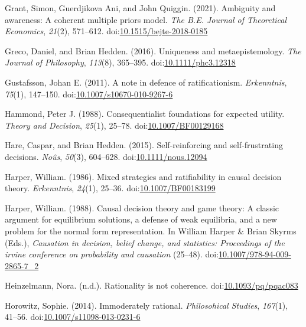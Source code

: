 \documentclass[
  12pt,
  letterpaper,
  DIV=11,
  numbers=noendperiod]{scrreprt}
\newlength{\cslhangindent}
\newenvironment{CSLReferences}[2] %
 {\begin{list}{}{%
  \setlength{\itemindent}{0pt}
  \setlength{\leftmargin}{0pt}
  \setlength{\parsep}{0pt}
  \ifodd #1
   \setlength{\leftmargin}{\cslhangindent}
   \setlength{\itemindent}{-1\cslhangindent}
  \fi
  \setlength{\itemsep}{#2\baselineskip}}}
 {\end{list}}
\begin{document}
\begin{CSLReferences}{1}{0}
Grant, Simon, Guerdjikova Ani, and John Quiggin. (2021). Ambiguity and
awareness: A coherent multiple priors model. \emph{The B.E. Journal of
Theoretical Economics}, \emph{21}(2), 571--612.
doi:\href{https://doi.org/10.1515/bejte-2018-0185}{10.1515/bejte-2018-0185}

Greco, Daniel, and Brian Hedden. (2016). Uniqueness and
metaepistemology. \emph{The Journal of Philosophy}, \emph{113}(8),
365--395.
doi:\href{https://doi.org/10.1111/phc3.12318}{10.1111/phc3.12318}

Gustafsson, Johan E. (2011). A note in defence of ratificationism.
\emph{Erkenntnis}, \emph{75}(1), 147--150.
doi:\href{https://doi.org/10.1007/s10670-010-9267-6}{10.1007/s10670-010-9267-6}

Hammond, Peter J. (1988). Consequentialist foundations for expected
utility. \emph{Theory and Decision}, \emph{25}(1), 25--78.
doi:\href{https://doi.org/10.1007/BF00129168}{10.1007/BF00129168}

Hare, Caspar, and Brian Hedden. (2015). Self-reinforcing and
self-frustrating decisions. \emph{Noûs}, \emph{50}(3), 604--628.
doi:\href{https://doi.org/10.1111/nous.12094}{10.1111/nous.12094}

Harper, William. (1986). Mixed strategies and ratifiability in causal
decision theory. \emph{Erkenntnis}, \emph{24}(1), 25--36.
doi:\href{https://doi.org/10.1007/BF00183199}{10.1007/BF00183199}

Harper, William. (1988). Causal decision theory and game theory: A
classic argument for equilibrium solutions, a defense of weak
equilibria, and a new problem for the normal form representation. In
William Harper \& Brian Skyrms (Eds.), \emph{Causation in decision,
belief change, and statistics: Proceedings of the irvine conference on
probability and causation} (25--48).
doi:\href{https://doi.org/10.1007/978-94-009-2865-7_2}{10.1007/978-94-009-2865-7\_2}

Heinzelmann, Nora. (n.d.). Rationality is not coherence.
doi:\href{https://doi.org/10.1093/pq/pqac083}{10.1093/pq/pqac083}

Horowitz, Sophie. (2014). Immoderately rational. \emph{Philosohical
Studies}, \emph{167}(1), 41--56.
doi:\href{https://doi.org/10.1007/s11098-013-0231-6}{10.1007/s11098-013-0231-6}


\end{CSLReferences}
\end{document}
